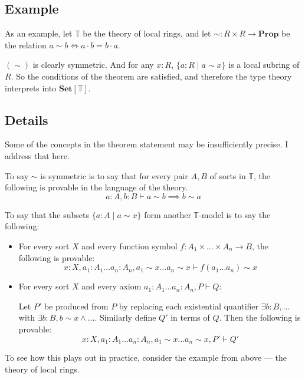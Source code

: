 \documentclass{article}
\newcommand*{\Prop}{\mathbf{Prop}}
\newcommand*{\Set}{\mathbf{Set}}
\newcommand*{\T}{\mathbb{T}}
\begin{document}
\subsection{Example}

As an example, let \(\T\) be the theory of local rings, and let \(\sim : R \times R \to \Prop\) be the relation \(a \sim b \iff a \cdot b = b \cdot a\).

\((\sim)\) is clearly symmetric. And for any \(x : R\), \(\{a : R \mid a \sim x\}\) is a local subring of \(R\).
So the conditions of the theorem are satisfied, and therefore the type theory interprets into \(\Set[\T]\).

\subsection{Details} \label{Details}

Some of the concepts in the theorem statement may be insufficiently precise. I address that here.

To say \(\sim\) is symmetric is to say that for every pair \(A,B\) of sorts in \(\T\),
the following is provable in the language of the theory.
\[a : A, b : B \vdash a \sim b \implies b \sim a\]

To say that the subsets \(\{a : A \mid a \sim x\}\) form another \(\T\)-model is to say the following:
\begin{itemize}
    \item For every sort \(X\) and every function symbol \(f : A_1 \times \dots \times A_n \to B\), the following is provable:
    \[x : X, a_1 : A_1 \dots a_n : A_n, a_1 \sim x \dots a_n \sim x \vdash f(a_1 \dots a_n) \sim x\]
    \item For every sort \(X\) and every axiom \(a_1 : A_1 \dots a_n : A_n, P \vdash Q\):
    
    Let \(P'\) be produced from \(P\)
    by replacing each existential quantifier \(\exists b : B, \dots\)
    with \(\exists b : B, b \sim x \land \dots\).
    Similarly define \(Q'\) in terms of \(Q\).
    Then the following is provable:
    \[x : X, a_1 : A_1 \dots a_n : A_n, a_1 \sim x \dots a_n \sim x, P' \vdash Q'\]
\end{itemize}

To see how this plays out in practice, consider the example from above --- the theory of local rings.
\end{document}
